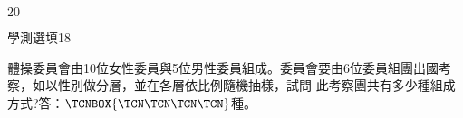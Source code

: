 \begin{QUESTIONS}
\begin{QUESTION}
\begin{QBODY}
        \end{QBODY}
        \begin{QFROMS}
        \end{QFROMS}
        \begin{QTAGS}\end{QTAGS}
        \begin{QANS}
		$20$
        \end{QANS}
        \begin{QSOLLIST}
        \end{QSOLLIST}
        \begin{QEMPTYSPACE}
        \end{QEMPTYSPACE}
    \end{QUESTION}
    \begin{QUESTION}
        \begin{ExamInfo}{89}{學測}{選填}{18}
        \end{ExamInfo}
        \begin{ExamAnsRateInfo}{}{}{}{}
        \end{ExamAnsRateInfo}
        \begin{QBODY}
			體操委員會由10位女性委員與5位男性委員組成。委員會要由6位委員組團出國考察，如以性別做分層，並在各層依比例隨機抽樣，試問
此考察團共有多少種組成方式?答：$\TCNBOX{\TCN\TCN\TCN\TCN}$種。


\end{QBODY}
\end{QUESTION}
\end{QUESTIONS}
